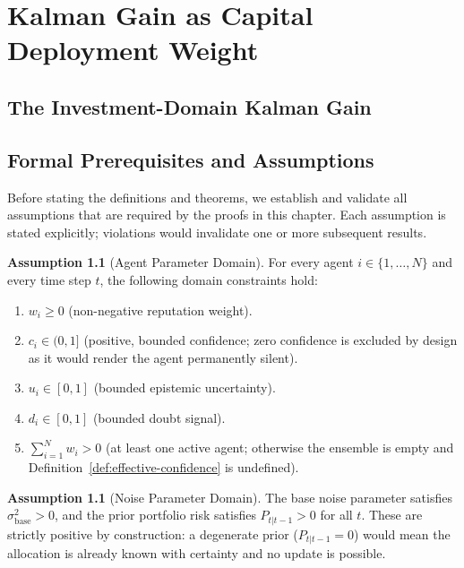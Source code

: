 \documentclass[12pt,openany]{book}
\numberwithin{equation}{chapter}
\theoremstyle{plain}
\theoremstyle{definition}
\newtheorem{assumption}[theorem]{Assumption}
\theoremstyle{remark}
\begin{document}
\chapter{Kalman Gain as Capital Deployment Weight}
\label{ch:kalman-gain}

\section{The Investment-Domain Kalman Gain}

\section{Formal Prerequisites and Assumptions}
\label{sec:kalman-gain-prereqs}

Before stating the definitions and theorems, we establish and
validate all assumptions that are required by the proofs in this
chapter.  Each assumption is stated explicitly; violations would
invalidate one or more subsequent results.

\begin{assumption}[Agent Parameter Domain]
\label{asm:agent-domain}
For every agent $i \in \{1, \ldots, N\}$ and every time step
$t$, the following domain constraints hold:
\begin{enumerate}
  \item $w_i \geq 0$ \quad (non-negative reputation weight).
  \item $c_i \in (0, 1]$ \quad (positive, bounded confidence;
        zero confidence is excluded by design as it would render
        the agent permanently silent).
  \item $u_i \in [0, 1]$ \quad (bounded epistemic uncertainty).
  \item $d_i \in [0, 1]$ \quad (bounded doubt signal).
  \item $\sum_{i=1}^{N} w_i > 0$ \quad (at least one active
        agent; otherwise the ensemble is empty and
        Definition~\ref{def:effective-confidence} is undefined).
\end{enumerate}
\end{assumption}

\begin{assumption}[Noise Parameter Domain]
\label{asm:noise-domain}
The base noise parameter satisfies $\sigma_{\mathrm{base}}^2 > 0$,
and the prior portfolio risk satisfies $P_{t|t-1} > 0$ for all
$t$.  These are strictly positive by construction: a
degenerate prior ($P_{t|t-1} = 0$) would mean the allocation is
already known with certainty and no update is possible.
\end{assumption}
\end{document}
